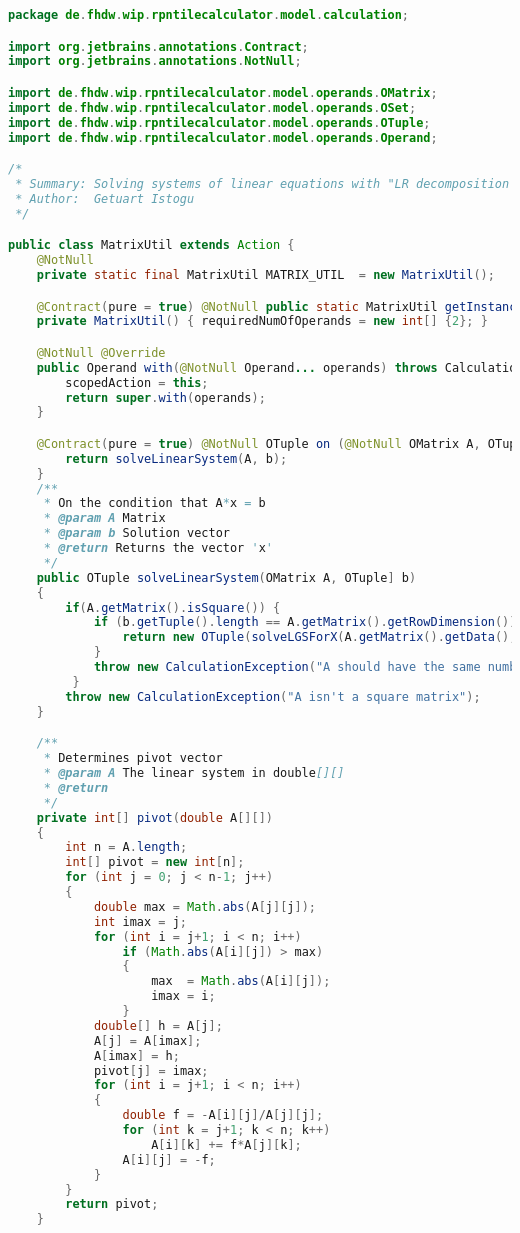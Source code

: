 \begin{lstlisting}[caption=MatrixUtil (Istogu),label=list:MatrixUtil,language=Java]
package de.fhdw.wip.rpntilecalculator.model.calculation;

import org.jetbrains.annotations.Contract;
import org.jetbrains.annotations.NotNull;

import de.fhdw.wip.rpntilecalculator.model.operands.OMatrix;
import de.fhdw.wip.rpntilecalculator.model.operands.OSet;
import de.fhdw.wip.rpntilecalculator.model.operands.OTuple;
import de.fhdw.wip.rpntilecalculator.model.operands.Operand;

/*
 * Summary: Solving systems of linear equations with "LR decomposition with column pivot search"
 * Author:  Getuart Istogu
 */

public class MatrixUtil extends Action {
    @NotNull
    private static final MatrixUtil MATRIX_UTIL  = new MatrixUtil();

    @Contract(pure = true) @NotNull public static MatrixUtil getInstance() { return MATRIX_UTIL; }
    private MatrixUtil() { requiredNumOfOperands = new int[] {2}; }

    @NotNull @Override
    public Operand with(@NotNull Operand... operands) throws CalculationException {
        scopedAction = this;
        return super.with(operands);
    }

    @Contract(pure = true) @NotNull OTuple on (@NotNull OMatrix A, OTuple b) {
        return solveLinearSystem(A, b);
    }
    /**
     * On the condition that A*x = b
     * @param A Matrix
     * @param b Solution vector
     * @return Returns the vector 'x'
     */
    public OTuple solveLinearSystem(OMatrix A, OTuple] b)
    {
        if(A.getMatrix().isSquare()) { 
        	if (b.getTuple().length == A.getMatrix().getRowDimension()) {
        		return new OTuple(solveLGSForX(A.getMatrix().getData(), b.getTuple()));
        	}
        	throw new CalculationException("A should have the same number of rows/columns as b values.");
         }
        throw new CalculationException("A isn't a square matrix");
    }

    /**
     * Determines pivot vector
     * @param A The linear system in double[][]
     * @return
     */
    private int[] pivot(double A[][])
    {
        int n = A.length;
        int[] pivot = new int[n];
        for (int j = 0; j < n-1; j++)
        {
            double max = Math.abs(A[j][j]);
            int imax = j;
            for (int i = j+1; i < n; i++)
                if (Math.abs(A[i][j]) > max)
                {
                    max  = Math.abs(A[i][j]);
                    imax = i;
                }
            double[] h = A[j];
            A[j] = A[imax];
            A[imax] = h;
            pivot[j] = imax;
            for (int i = j+1; i < n; i++)
            {
                double f = -A[i][j]/A[j][j];
                for (int k = j+1; k < n; k++)
                    A[i][k] += f*A[j][k];
                A[i][j] = -f;
            }
        }
        return pivot;
    }


\end{lstlisting}
